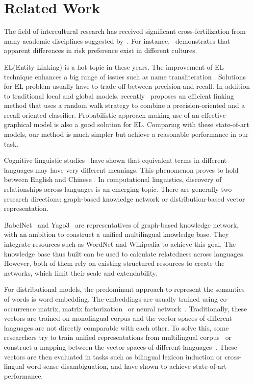 \section{Related Work}
\label{sec:related}
The field of intercultural research has received significant cross-fertilization from many
academic disciplines suggested by~\cite{triandis1994culture}. For instance,~\cite{weber1998cross}
demonstrates that apparent differences in risk preference exist in different cultures.

EL(Entity Linking) is a hot topic in these years.
The improvement of EL technique enhances a big range of issues such as name transliteration
\cite{lin2016leveraging}.
Solutions for EL problem
usually have to trade off between precision and recall. In addition to traditional local and global
models, recently~\cite{gruetze2016coheel} proposes an efficient
linking method that uses a random walk strategy to combine a precision-oriented and a recall-oriented
classifier. Probabilistic approach making use of an effective graphical model\cite{ganea2016probabilistic}
is also a good solution for EL. Comparing with these state-of-art models, our method is much simpler but
achieve a reasonable performance in our task.

Cognitive linguistic studies~\cite{kovecses2006language}
have shown that equivalent terms in different languages may have very different meanings.
This phenomenon proves to hold between English and Chinese
\cite{chen2007chinese,tavassoli1999temporal,krifka199511}.
In computational linguistics, discovery of relationships across languages is an emerging topic.
There are generally two research directions: graph-based knowledge network or
distribution-based vector representation.

BabelNet~\cite{Navigli:2012dn} and Yago3~\cite{mahdisoltani2014yago3} are representatives
of graph-based knowledge network, with an ambition
to construct a unified multilingual knowledge base. They
integrate resources such as WordNet and Wikipedia to achieve
this goal. The knowledge base thus built can be used to
calculate relatedness across languages. However, both of them
rely on existing structured resources to create the networks,
which limit their scale and extendability.

For distributional models, the predominant approach to
represent the semantics of words is word embedding.
The embeddings are usually trained
using co-occurrence matrix,
matrix factorization~\cite{lebret2013word,levy2014neural,li2015word} or
neural network~\cite{Mikolov2013distributed}.
Traditionally, these vectors are trained on monolingual corpus and
the vector spaces of different languages are not directly comparable
with each other. To solve this, some researchers try to train
unified representations from multilingual
corpus~\cite{Klementiev:2012uk,hermann2014multilingual,Vulic:2015to}
or construct a mapping between the vector spaces of
different languages~\cite{Mikolov:2013tp}.
These vectors are then evaluated
in tasks such as bilingual lexicon induction or cross-lingual
word sense disambiguation, and have shown to achieve
state-of-art performance.

